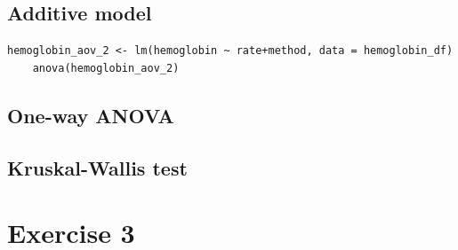 \documentclass{article}
\begin{document}
\subsection{Additive model}
\begin{lstlisting}[caption="Additive model for Two-Way ANOVA", label={lst:Add}]
    hemoglobin_aov_2 <- lm(hemoglobin ~ rate+method, data = hemoglobin_df)
    anova(hemoglobin_aov_2) 
\end{lstlisting}


\subsection{One-way ANOVA}

\subsection{Kruskal-Wallis test}


\section{Exercise 3}




\end{document}
